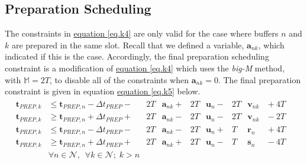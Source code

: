 \subsection{Preparation Scheduling}\label{SS.prepsched}
The constraints in \hyperref[eq.k4]{equation \ref*{eq.k4}} are only valid for
the case where buffers $n$ and $k$ are prepared in the same slot.
Recall that we defined a variable, $\boldsymbol{a}_{nk}$, which indicated if
this is the case.
Accordingly, the final preparation scheduling constraint is a modification of
\hyperref[eq.k4]{equation \ref*{eq.k4}} which uses the \emph{big-M} method,
with $\mathbb{M} = 2T$, to disable all of the constraints when
$\boldsymbol{a}_{nk} = 0$.
The final preparation constraint is given in equation
\hyperref[eq.k5]{equation \ref*{eq.k5}} below. 
\begin{equation}
    \begin{split}
        \begin{alignedat}{14}
            \boldsymbol{t}_{\mathit{PREP},k}
            &\le \boldsymbol{t}_{\mathit{PREP},n}
            - \Delta t_{\mathit{PREP}} {}-{} & 2T &\boldsymbol{a}_{nk}
            {}+{} & 2T &\boldsymbol{u}_{n}
            {}-{} & 2T &\boldsymbol{v}_{nk} & {}+{} 4T&\\
            \boldsymbol{t}_{\mathit{PREP},k}
            &\ge \boldsymbol{t}_{\mathit{PREP},n}
            + \Delta t_{\mathit{PREP}} {}+{} & 2T &\boldsymbol{a}_{nk}
            {}-{} & 2T &\boldsymbol{u}_{n}
            {}-{} & 2T &\boldsymbol{v}_{nk} & {}-{} 2T&\\
            \boldsymbol{t}_{\mathit{PREP},k}
            &\le \boldsymbol{t}_{\mathit{PREP},n}
            - \Delta t_{\mathit{PREP}} {}-{} & 2T &\boldsymbol{a}_{nk}
            {}-{} & 2T &\boldsymbol{u}_{n}
            {}+{} & T &\boldsymbol{r}_{n} & {}+{} 4T&\\
            \boldsymbol{t}_{\mathit{PREP},k}
            &\ge \boldsymbol{t}_{\mathit{PREP},n}
            + \Delta t_{\mathit{PREP}} {}+{} & 2T &\boldsymbol{a}_{nk}
            {}+{} & 2T &\boldsymbol{u}_{n}
            {}-{} & T &\boldsymbol{s}_{n} & {}-{} 4T&\\
            &\forall n \in \mathcal{N}, \enspace \forall k \in \mathcal{N}; \;
            k > n
            \end{alignedat}            
    \end{split}
    \label{eq.k5}
\end{equation}

